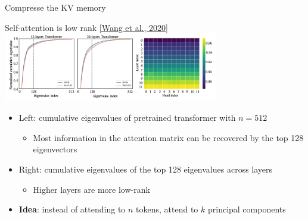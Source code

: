 \documentclass[usenames,dvipsnames,notes,11pt,aspectratio=169,hyperref={colorlinks=true, linkcolor=blue}]{beamer}
\begin{document}
\begin{frame}
    {Compresse the KV memory}

    Self-attention is low rank \href{https://arxiv.org/pdf/2006.04768.pdf}{[Wang et al., 2020]}\\[1ex]
    {\centering
    \includegraphics[height=3cm]{figures/low-rank}}

    \begin{itemize}[<+->]
        \item Left: cumulative eigenvalues of pretrained transformer with $n=512$
            \begin{itemize}
                \item Most information in the attention matrix can be recovered by the top 128 eigenvectors %
            \end{itemize}
        \item Right: cumulative eigenvalues of the top 128 eigenvalues across layers 
            \begin{itemize}
                \item Higher layers are more low-rank 
            \end{itemize}
        \item \textbf{Idea}: instead of attending to $n$ tokens, attend to $k$ principal components 
    \end{itemize}
\end{frame}
\end{document}
